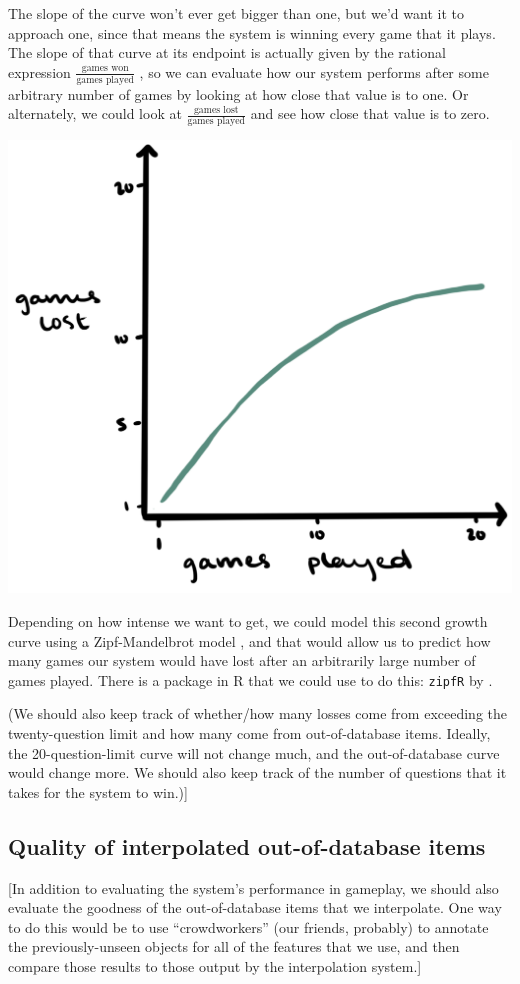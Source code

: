 \documentclass[11pt,a4paper]{article}
\begin{document}
The slope of the curve won't ever get bigger than one, but we'd want it to approach one, since that means the system is winning every game that it plays.
The slope of that curve at its endpoint is actually given by the rational expression $\frac{\text{games won}}{\text{games played}}$ \citep[50--51]{Baayen2001}, so we can evaluate how our system performs after some arbitrary number of games by looking at how close that value is to one.
Or alternately, we could look at $\frac{\text{games lost}}{\text{games played}}$ and see how close that value is to zero.
\begin{center}
	\includegraphics[width=.5\linewidth]{graphics/growth-curve2.png}
\end{center}

Depending on how intense we want to get, we could model this second growth curve using a Zipf-Mandelbrot model \citep{Evert2004}, and that would allow us to predict how many games our system would have lost after an arbitrarily large number of games played.
There is a package in R that we could use to do this: \texttt{zipfR} by \citet{BaroniEvert2014}.

(We should also keep track of whether/how many losses come from exceeding the twenty-question limit and how many come from out-of-database items. Ideally, the 20-question-limit curve will not change much, and the out-of-database curve would change more.
We should also keep track of the number of questions that it takes for the system to win.)]

\subsection{Quality of interpolated out-of-database items}

[In addition to evaluating the system's performance in gameplay, we should also evaluate the goodness of the out-of-database items that we interpolate.
One way to do this would be to use ``crowdworkers'' (our friends, probably) to annotate the previously-unseen objects for all of the features that we use, and then compare those results to those output by the interpolation system.]
\end{document}
